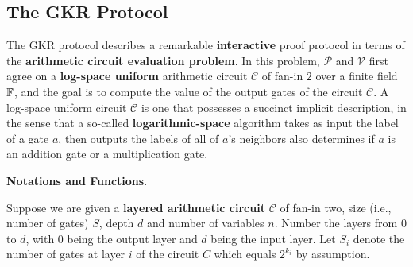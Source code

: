 \documentclass{article}
\begin{document}
\subsection{The GKR Protocol}

The GKR protocol describes a remarkable \textbf{interactive} proof protocol in terms of the \textbf{arithmetic circuit evaluation problem}. In this problem, $\mathcal{P}$ and $\mathcal{V}$ first agree on a \textbf{log-space uniform} arithmetic circuit $\mathcal{C}$ of fan-in $2$ over a finite field $\mathbb{F}$, and the goal is to compute the value of the output gates of the circuit $\mathcal{C}$. A log-space uniform circuit $\mathcal{C}$ is one that possesses a succinct implicit description, in the sense that a so-called \textbf{logarithmic-space} algorithm takes as input the label of a gate $a$, then outputs the labels of all of $a$'s neighbors also determines if $a$ is an addition gate or a multiplication gate. 

\textbf{Notations and Functions}. 

Suppose we are given a \textbf{layered arithmetic circuit} $\mathcal{C}$ of fan-in two, size (i.e., number of gates) $S$, depth $d$ and number of variables $n$. Number the layers from $0$ to $d$, with $0$ being the output layer and $d$ being the input layer. Let $S_i$ denote the number of gates at layer $i$ of the circuit $C$ which equals $2^{k_i}$ by assumption. 
\end{document}
